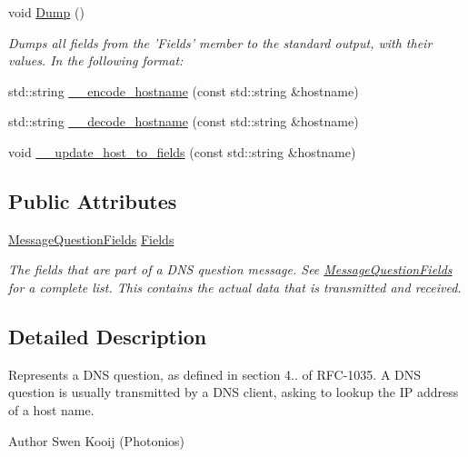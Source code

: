 \begin{DoxyCompactItemize}
void \hyperlink{class_senergy_1_1_dns_1_1_message_question_a7ac084601ff3285c6e47e7ce7ccc09cf}{Dump} ()
\begin{DoxyCompactList}\small\item\em Dumps all fields from the 'Fields' member to the standard output, with their values. In the following format\-: \end{DoxyCompactList}\item 
std\-::string \hyperlink{class_senergy_1_1_dns_1_1_message_question_a4557a95908c9f5e0b52c160f5ad70cc8}{\-\_\-\-\_\-encode\-\_\-hostname} (const std\-::string \&hostname)
\item 
std\-::string \hyperlink{class_senergy_1_1_dns_1_1_message_question_aa0c2322c65b839fd806c255549cb6ca6}{\-\_\-\-\_\-decode\-\_\-hostname} (const std\-::string \&hostname)
\item 
void \hyperlink{class_senergy_1_1_dns_1_1_message_question_a38d37becaefb52d8a2f9fb73d08b039e}{\-\_\-\-\_\-update\-\_\-host\-\_\-to\-\_\-fields} (const std\-::string \&hostname)
\end{DoxyCompactItemize}
\subsection*{Public Attributes}
\begin{DoxyCompactItemize}
\item 
\hyperlink{struct_senergy_1_1_dns_1_1_message_question_fields}{Message\-Question\-Fields} \hyperlink{class_senergy_1_1_dns_1_1_message_question_a9fad900307a2b2f48c441b657429102f}{Fields}
\begin{DoxyCompactList}\small\item\em The fields that are part of a D\-N\-S question message. See \hyperlink{struct_senergy_1_1_dns_1_1_message_question_fields}{Message\-Question\-Fields} for a complete list. This contains the actual data that is transmitted and received. \end{DoxyCompactList}\end{DoxyCompactItemize}


\subsection{Detailed Description}
Represents a D\-N\-S question, as defined in section 4.. of R\-F\-C-\/1035. A D\-N\-S question is usually transmitted by a D\-N\-S client, asking to lookup the I\-P address of a host name. 

\begin{DoxyAuthor}{Author}
Swen Kooij (Photonios) 
\end{DoxyAuthor}


